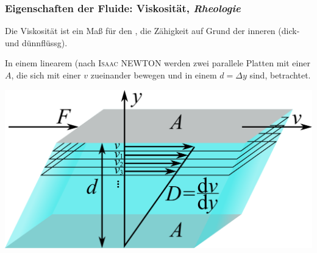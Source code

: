 
\begin{frame}
  \frametitle{Eigenschaften der Fluide: Viskosit\"at, \emph{Rheologie}}
  
  Die Viskosit\"at ist ein Ma\ss{} f\"ur den , die Z\"ahigkeit
  auf Grund der inneren  (dick- und d\"unnfl\"ussg).

  \parbox[c]{0.51\linewidth}{
    In einem linearem  (nach \textsc{Isaac NEWTON} werden zwei parallele 
    Platten mit einer  $A$,
    die sich mit einer  $v$ zueinander bewegen und 
    in einem  $d=\Delta y$ sind, betrachtet.
  }\parbox[c]{0.48\linewidth}{
      \includegraphics[width=\linewidth]{./ch01.basics/pics/Definition_Viskositaet}
  } 

  \ifteacher%
  \else%
    \vspace*{-0.0\baselineskip}\rotatebox[origin=lB]{180}{%
    \resizebox{0.9\linewidth}{!}{\parbox[t]{3.95\linewidth}{%
  Flie\ss{}widerstand, Reibung, Modell, Fl\"ache, Relativgeschwindigkeit, Abstand
    }}}
  \fi%
  

\end{frame}
